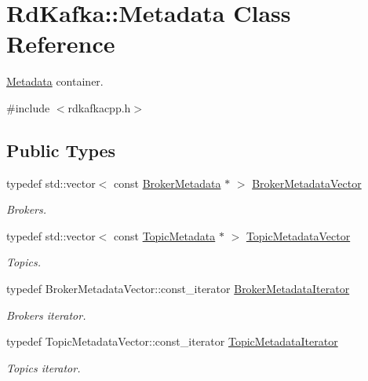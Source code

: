 \hypertarget{classRdKafka_1_1Metadata}{
\section{RdKafka::Metadata Class Reference}
\label{classRdKafka_1_1Metadata}
}


\hyperlink{classRdKafka_1_1Metadata}{Metadata} container.  


{\ttfamily \#include $<$rdkafkacpp.h$>$}\subsection*{Public Types}
\begin{DoxyCompactItemize}
\item 
\hypertarget{classRdKafka_1_1Metadata_a965c9ca825ca6334df81f397b43711af}{
typedef std::vector$<$ const \hyperlink{classRdKafka_1_1BrokerMetadata}{BrokerMetadata} $\ast$ $>$ \hyperlink{classRdKafka_1_1Metadata_a965c9ca825ca6334df81f397b43711af}{BrokerMetadataVector}}
\label{classRdKafka_1_1Metadata_a965c9ca825ca6334df81f397b43711af}

\begin{DoxyCompactList}\small\item\em Brokers. \item\end{DoxyCompactList}\item 
\hypertarget{classRdKafka_1_1Metadata_a297b2b875e4e7a68ffc1c0b1fc03fa05}{
typedef std::vector$<$ const \hyperlink{classRdKafka_1_1TopicMetadata}{TopicMetadata} $\ast$ $>$ \hyperlink{classRdKafka_1_1Metadata_a297b2b875e4e7a68ffc1c0b1fc03fa05}{TopicMetadataVector}}
\label{classRdKafka_1_1Metadata_a297b2b875e4e7a68ffc1c0b1fc03fa05}

\begin{DoxyCompactList}\small\item\em Topics. \item\end{DoxyCompactList}\item 
\hypertarget{classRdKafka_1_1Metadata_af5a9a87eba1dfdbf2f0123e588b043be}{
typedef BrokerMetadataVector::const\_\-iterator \hyperlink{classRdKafka_1_1Metadata_af5a9a87eba1dfdbf2f0123e588b043be}{BrokerMetadataIterator}}
\label{classRdKafka_1_1Metadata_af5a9a87eba1dfdbf2f0123e588b043be}

\begin{DoxyCompactList}\small\item\em Brokers iterator. \item\end{DoxyCompactList}\item 
\hypertarget{classRdKafka_1_1Metadata_af8256b8595093a00eb4c930d9c3e559c}{
typedef TopicMetadataVector::const\_\-iterator \hyperlink{classRdKafka_1_1Metadata_af8256b8595093a00eb4c930d9c3e559c}{TopicMetadataIterator}}
\label{classRdKafka_1_1Metadata_af8256b8595093a00eb4c930d9c3e559c}

\begin{DoxyCompactList}\small\item\em Topics iterator. \item\end{DoxyCompactList}\end{DoxyCompactItemize}
